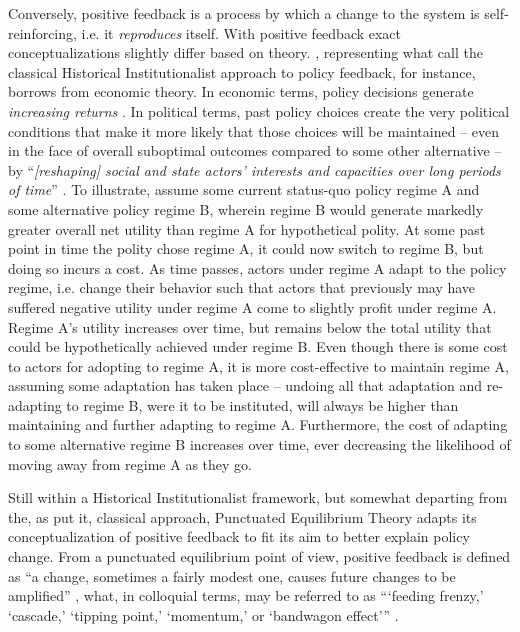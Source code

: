 \documentclass[11pt]{article}
\begin{document}
Conversely, positive feedback is a process by which a change to the system is self-reinforcing, i.e. it \textit{reproduces} itself. With positive feedback exact conceptualizations slightly differ based on theory. \textcite{Pierson2000}, representing what \textcite{Jacobs2014} call the classical Historical Institutionalist approach to policy feedback, for instance, borrows from economic theory. In economic terms, policy decisions generate \textit{increasing returns} \parencite[for economic discussion see][]{Arthur1994}. In political terms, past policy choices create the very political conditions that make it more likely that those choices will be maintained -- even in the face of overall suboptimal outcomes compared to some other alternative -- by \enquote{\textit{[reshaping] social and state actors' interests and capacities over long periods of time}} \parencite[][p. 443, original emphasis]{Jacobs2014}. To illustrate, assume some current status-quo policy regime A and some alternative policy regime B, wherein regime B would generate markedly greater overall net utility than regime A for hypothetical polity. At some past point in time the polity chose regime A, it could now switch to regime B, but doing so incurs a cost. As time passes, actors under regime A adapt to the policy regime, i.e. change their behavior such that actors that previously may have suffered negative utility under regime A come to slightly profit under regime A. Regime A's utility increases over time, but remains below the total utility that could be hypothetically achieved under regime B. Even though there is some cost to actors for adopting to regime A, it is more cost-effective to maintain regime A, assuming some adaptation has taken place -- undoing all that adaptation and re-adapting to regime B, were it to be instituted, will always be higher than maintaining and further adapting to regime A. Furthermore, the cost of adapting to some alternative regime B increases over time, ever decreasing the likelihood of moving away from regime A as they go.

Still within a Historical Institutionalist framework, but somewhat departing from the, as \textcite{Jacobs2014} put it, classical approach, Punctuated Equilibrium Theory \parencites{Baumgartner2009}{Baumgartner2002} adapts its conceptualization of positive feedback to fit its aim to better explain policy change. From a punctuated equilibrium point of view, positive feedback is defined as \enquote{a change, sometimes a fairly modest one, causes future changes to be amplified} \parencite[p. 61]{Baumgartner2018}, what, in colloquial terms, may be referred to as \enquote{\enquote{feeding frenzy,} \enquote{cascade,} \enquote{tipping point,} \enquote{momentum,} or \enquote{bandwagon effect}} .
\end{document}
